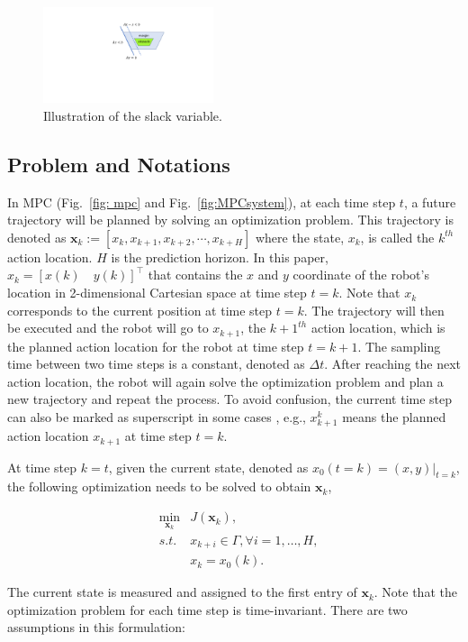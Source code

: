 \documentclass[letterpaper, 10 pt, conference]{ieeeconf}  %
\begin{document}
\begin{figure}[t]
      \centering
      \includegraphics[width=5cm]{plot/slack.pdf}
      \caption{Illustration of the slack variable. }
      \label{fig:slack}
\end{figure}

\subsection{Problem and Notations}
In MPC (Fig.~\ref{fig: mpc} and Fig.~\ref{fig:MPCsystem}), at each time step $t$, a future trajectory will be planned by solving an optimization problem. This trajectory is denoted as $\mathbf{x}_{k} := [x_k, x_{k+1},x_{k+2},\cdots,x_{k+H}]$ where the state, $x_k$, is called the $k^{th}$ action location. $H$ is the prediction horizon. In this paper, $x_k= [x(k)\quad y(k)]^{\intercal}$ that contains the $x$ and $y$ coordinate of the robot's location in 2-dimensional Cartesian space at time step $t=k$. Note that $x_k$ corresponds to the current position at time step $t=k$. The trajectory will then be executed and the robot will go to $x_{k+1}$, the $k+1^{th}$ action location, which is the planned action location for the robot at time step $t=k+1$. The sampling time between two time steps is a constant, denoted as $\Delta t$. After reaching the next action location, the robot will again solve the optimization problem and plan a new trajectory and repeat the process. To avoid confusion, the current time step can also be marked as superscript in some cases , e.g., $x_{k+1}^k$ means the planned action location $x_{k+1}$ at time step $t=k$.

At time step $k=t$, given the current state, denoted as $x_0(t=k) = (x,y)|_{t=k}$, the following optimization needs to be solved to obtain $\mathbf{x}_k$,


\begin{eqnarray}
&\min_{\mathbf{x}_{k}} & J(\mathbf{x}_k),\\
&s.t.& x_{k+i}\in\Gamma,\forall i=1,\ldots,H,\\
&&         x_{k}=x_0(k).
\end{eqnarray}

The current state is measured and assigned to the first entry of $\mathbf{x}_{k}$. Note that the optimization problem for each time step is time-invariant. There are two assumptions in this formulation: 
\end{document}
